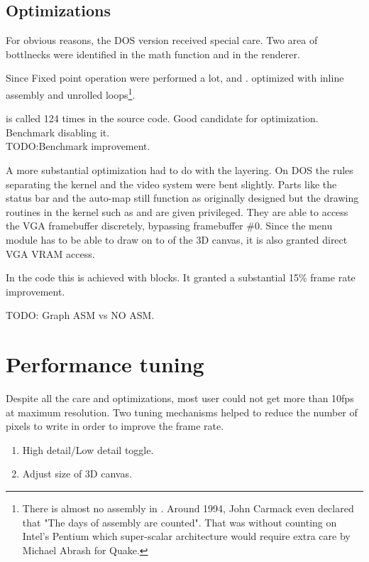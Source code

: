 \subsection{Optimizations}
For obvious reasons, the DOS version received special care. Two area of bottlnecks were identified in the math function and in the renderer.\\
\par
Since Fixed point operation were performed a lot,  and  .  optimized with inline assembly and unrolled loops\footnote{There is almost no assembly in \doom. Around 1994, John Carmack even declared that "The days of assembly are counted". That was without counting on Intel's Pentium which super-scalar architecture would require extra care by Michael Abrash for Quake.}.\\
\par
{} is called 124 times in the source code. Good candidate for optimization. Benchmark disabling it.\\
TODO:Benchmark improvement.\\
\par
A more substantial optimization had to do with the layering. On DOS the rules separating the kernel and the video system were bent slightly. Parts like the status bar and the auto-map still function as originally designed but the drawing routines in the kernel such as  and  are given privileged. They are able to access the VGA framebuffer discretely, bypassing framebuffer \#0. Since the menu module has to be able to draw on to of the 3D canvas, it is also granted direct VGA VRAM access.\\
\par
In the code this is achieved with  blocks. It granted a substantial 15\% frame rate improvement.\\
 \par 
TODO: Graph ASM vs NO ASM.\\
 \par
 
\section{Performance tuning}
Despite all the care and optimizations, most user could not get more than 10fps at maximum resolution. Two tuning mechanisms helped to reduce the number of pixels to write in order to improve the frame rate.
\begin{enumerate}
\item High detail/Low detail toggle.
\item Adjust size of 3D canvas.
\end{enumerate}
\par

